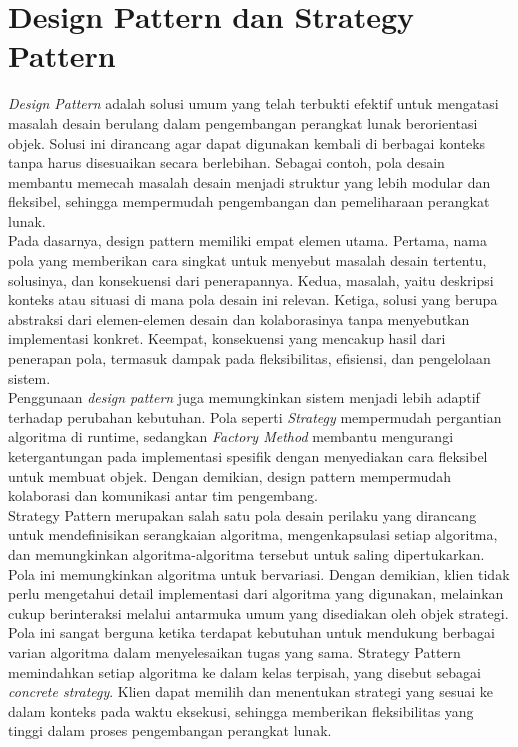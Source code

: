 \section{Design Pattern dan Strategy Pattern ~\cite{Gamma:94:design}}
\label{sec:designdanstrategypattern}
\textit{Design Pattern} adalah solusi umum yang telah terbukti efektif untuk mengatasi masalah desain berulang dalam pengembangan perangkat lunak berorientasi objek. Solusi ini dirancang agar dapat digunakan kembali di berbagai konteks tanpa harus disesuaikan secara berlebihan. Sebagai contoh, pola desain membantu memecah masalah desain menjadi struktur yang lebih modular dan fleksibel, sehingga mempermudah pengembangan dan pemeliharaan perangkat lunak.
\\
Pada dasarnya, design pattern memiliki empat elemen utama. Pertama, nama pola yang memberikan cara singkat untuk menyebut masalah desain tertentu, solusinya, dan konsekuensi dari penerapannya. Kedua, masalah, yaitu deskripsi konteks atau situasi di mana pola desain ini relevan. Ketiga, solusi yang berupa abstraksi dari elemen-elemen desain dan kolaborasinya tanpa menyebutkan implementasi konkret. Keempat, konsekuensi yang mencakup hasil dari penerapan pola, termasuk dampak pada fleksibilitas, efisiensi, dan pengelolaan sistem.
\\
Penggunaan \textit{design pattern} juga memungkinkan sistem menjadi lebih adaptif terhadap perubahan kebutuhan. Pola seperti \textit{Strategy} mempermudah pergantian algoritma di runtime, sedangkan \textit{Factory Method} membantu mengurangi ketergantungan pada implementasi spesifik dengan menyediakan cara fleksibel untuk membuat objek. Dengan demikian, design pattern mempermudah kolaborasi dan komunikasi antar tim pengembang.
\\
Strategy Pattern merupakan salah satu pola desain perilaku yang dirancang untuk mendefinisikan serangkaian algoritma, mengenkapsulasi setiap algoritma, dan memungkinkan algoritma-algoritma tersebut untuk saling dipertukarkan. Pola ini memungkinkan algoritma untuk bervariasi. Dengan demikian, klien tidak perlu mengetahui detail implementasi dari algoritma yang digunakan, melainkan cukup berinteraksi melalui antarmuka umum yang disediakan oleh objek strategi.
\\
Pola ini sangat berguna ketika terdapat kebutuhan untuk mendukung berbagai varian algoritma dalam menyelesaikan tugas yang sama. Strategy Pattern memindahkan setiap algoritma ke dalam kelas terpisah, yang disebut sebagai \textit{concrete strategy}. Klien dapat memilih dan menentukan strategi yang sesuai ke dalam konteks pada waktu eksekusi, sehingga memberikan fleksibilitas yang tinggi dalam proses pengembangan perangkat lunak.

